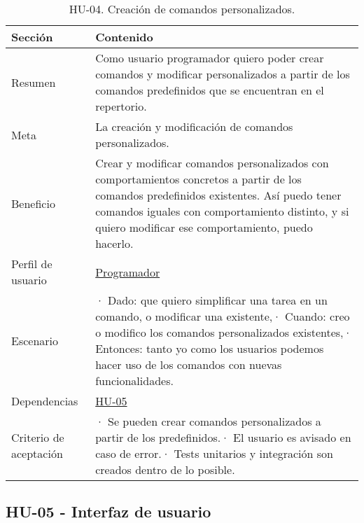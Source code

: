 \FloatBarrier
\begin{table}[h]
    \centering
    \def\arraystretch{1.25}
    \begin{adjustbox}{max width=\textwidth}
    \begin{tabularx}{\textwidth}{|l|L|}
    \hline
        \textbf{Sección} & \textbf{Contenido} \\ \hline
    \hline
        Resumen & Como usuario programador quiero poder crear comandos y modificar personalizados a partir de los comandos predefinidos que se encuentran en el repertorio. \\ \hline
        Meta & La creación y modificación de comandos personalizados. \\ \hline
        Beneficio & Crear y modificar comandos personalizados con comportamientos concretos a partir de los comandos predefinidos existentes. Así puedo tener comandos iguales con comportamiento distinto, y si quiero modificar ese comportamiento, puedo hacerlo. \\ \hline
        Perfil de usuario & \hyperref[sec:personaProgramador]{Programador} \\ \hline
        Escenario & · Dado: que quiero simplificar una tarea en un comando, o modificar una existente,\linebreak · Cuando: creo o modifico los comandos personalizados existentes,\linebreak · Entonces: tanto yo como los usuarios podemos hacer uso de los comandos con nuevas funcionalidades. \\ \hline
        Dependencias & \hyperref[sec:hu05]{HU-05} \\ \hline
        Criterio de aceptación & · Se pueden crear comandos personalizados a partir de los predefinidos.\linebreak · El usuario es avisado en caso de error.\linebreak · Tests unitarios y integración son creados dentro de lo posible. \\ \hline
    \end{tabularx}
    \end{adjustbox}
    \caption{HU-04. Creación de comandos personalizados.}
\end{table}
\FloatBarrier

\bigskip
\bigskip
\bigskip
\bigskip
\bigskip
\pagebreak

\subsection{HU-05 - Interfaz de usuario}
\label{sec:hu05}


